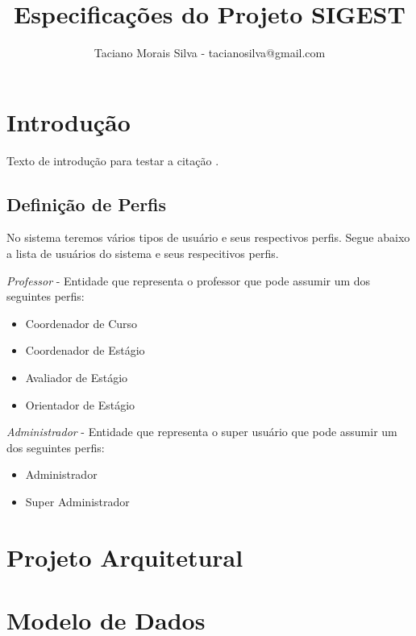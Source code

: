 \documentclass[12pt,a4paper]{report}
\title{Especificações do Projeto SIGEST}
\author{Taciano Morais Silva - tacianosilva@gmail.com}
\begin{document}
\maketitle
\listoffigures
\tableofcontents

\chapter{Introdução}

Texto de introdução para testar a citação \cite{morais04a}.

\section{Definição de Perfis}

No sistema teremos vários tipos de usuário e seus respectivos perfis.
Segue abaixo a lista de usuários do sistema e seus respecitivos perfis. 

\emph{Professor} - Entidade que representa o professor que pode assumir um dos
seguintes perfis:

\begin{itemize}
\item Coordenador de Curso
\item Coordenador de Estágio
\item Avaliador de Estágio
\item Orientador de Estágio
\end{itemize}

\emph{Administrador} - Entidade que representa o super usuário que pode
assumir um dos seguintes perfis:

\begin{itemize}
\item Administrador
\item Super Administrador
\end{itemize}

\chapter{Projeto Arquitetural}

\chapter{Modelo de Dados}
\end{document}
